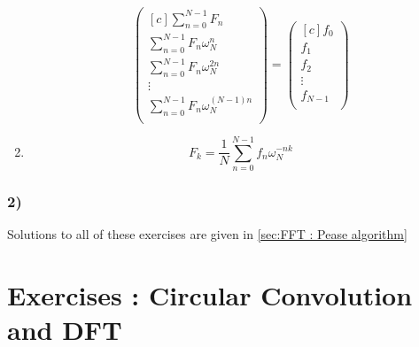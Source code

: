 \begin{enumerate}
\[
\begin{pmatrix*}[c]
    \sum_{n=0}^{N-1} F_n \\[0.5em]
    \sum_{n=0}^{N-1} F_n\omega _{ N }^{ n } \\[0.5em]
    \sum_{n=0}^{N-1} F_n\omega _{ N }^{ 2n } \\[0.5em]
     \vdots  \\ 
     \sum_{n=0}^{N-1} F_n\omega _{ N }^{ (N-1)n } \\[0.5em]
\end{pmatrix*}
=
\begin{pmatrix*}[c]
    f_0 \\[0.5em]
    f_1 \\[0.5em]
    f_2 \\[0.5em]
    \vdots \\ 
    f_{N-1} \\[0.5em] 
\end{pmatrix*}
\]

\item 
    \[ F_k = \frac{ 1 }{ N } \sum_{n=0}^{N-1} f_n\omega _{ N }^{ -nk }  \]

\end{enumerate}

\subsubsection{2)}
Solutions to all of these exercises are given in \ref{sec:FFT : Pease algorithm} 




\section{Exercises : Circular Convolution and DFT}
\label{sec:Exercises : Circular Convolution and DFT}

